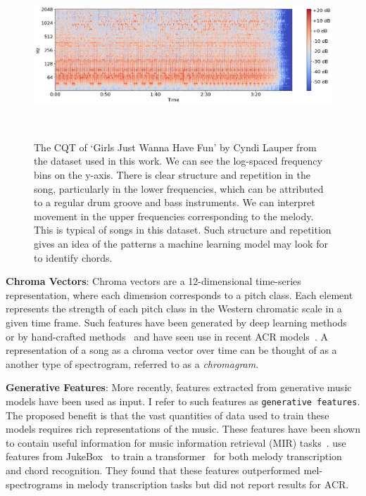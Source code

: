 \begin{figure}[H]
    \centering
    \includegraphics[width=1\textwidth]{figures/sample_cqt.png}
    \caption{The CQT of `Girls Just Wanna Have Fun' by Cyndi Lauper from the dataset used in this work. We can see the log-spaced frequency bins on the y-axis. There is clear structure and repetition in the song, particularly in the lower frequencies, which can be attributed to a regular drum groove and bass instruments. We can interpret movement in the upper frequencies corresponding to the melody. This is typical of songs in this dataset. Such structure and repetition gives an idea of the patterns a machine learning model may look for to identify chords.}~\label{fig:cqt_example}
\end{figure}

\textbf{Chroma Vectors}: Chroma vectors are a 12-dimensional time-series representation, where each dimension corresponds to a pitch class. Each element represents the strength of each pitch class in the Western chromatic scale in a given time frame. Such features have been generated by deep learning methods~\citep{BalanceRandomForestACR} or by hand-crafted methods~\citep{NNLSChroma,librosa} and have seen use in recent ACR models~\citep{HarmonyTransformer}. A representation of a song as a chroma vector over time can be thought of as a another type of spectrogram, referred to as a \emph{chromagram}.

\textbf{Generative Features}: More recently, features extracted from generative music models have been used as input. I refer to such features as \texttt{generative features}. The proposed benefit is that the vast quantities of data used to train these models requires rich representations of the music. These features have been shown to contain useful information for music information retrieval (MIR) tasks~\citep{GenerativeFeaturesforMIR}. \citet{MelodyTranscriptionViaGenerativePreTraining} use features from JukeBox~\citep{Jukebox} to train a transformer~\citep{AttentionIsAllYouNeed} for both melody transcription and chord recognition. They found that these features outperformed mel-spectrograms in melody transcription tasks but did not report results for ACR.


